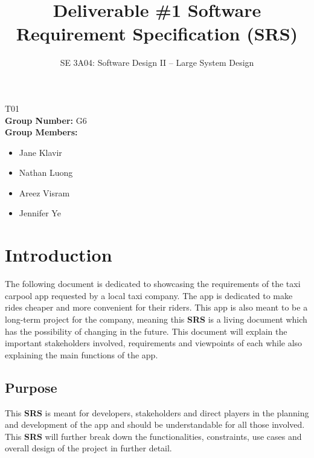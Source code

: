 \documentclass[]{article}
\title{Deliverable \#1 Software Requirement Specification (SRS)}
\author{SE 3A04: Software Design II -- Large System Design}
\date{}
\begin{document}
\maketitle	
{} T01\\
{\bf Group Number:} G6 \\
{\bf Group Members:} 
\begin{itemize}
	\item Jane Klavir
	\item Nathan Luong
	\item Areez Visram
	\item Jennifer Ye
\end{itemize}

\section{Introduction}
\label{sec:introduction}

The following document is dedicated to showcasing the requirements of the taxi carpool app requested by a local taxi company. The app is dedicated to make rides cheaper and more convenient for their riders. This app is also meant to be a long-term project for the company, meaning this \textbf{SRS} is a living document which has the possibility of changing in the future. This document will explain the important stakeholders involved, requirements and viewpoints of each while also explaining the main functions of the app.

\subsection{Purpose}
\label{sub:purpose}
This \textbf{SRS} is meant for developers, stakeholders and direct players in the planning and development of the app and should be understandable for all those involved. This \textbf{SRS} will further break down the functionalities, constraints, use cases and overall design of the project in further detail. 

\end{document}
